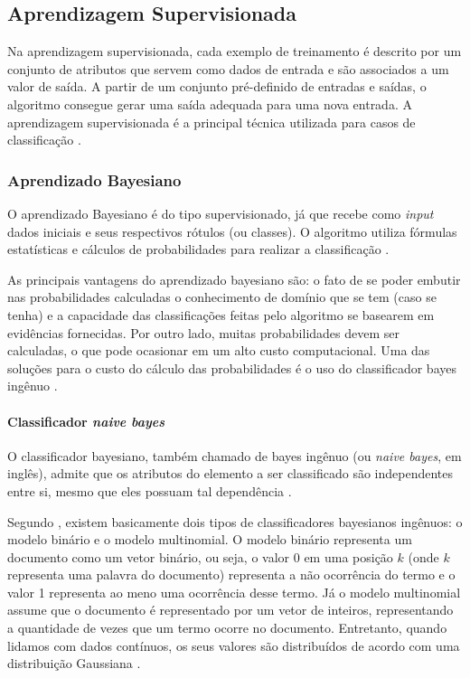 \subsection{Aprendizagem Supervisionada}

Na aprendizagem supervisionada, cada exemplo de treinamento é descrito por um conjunto de atributos que servem como dados de entrada e são associados a um valor de saída. A partir de um conjunto pré-definido de entradas e saídas, o algoritmo consegue gerar uma saída adequada para uma nova entrada. A aprendizagem supervisionada é a principal técnica utilizada para casos de classificação \cite{mohri2012}.

\subsubsection{Aprendizado Bayesiano}

O aprendizado Bayesiano é do tipo supervisionado, já que recebe como \textit{input} dados iniciais e seus respectivos rótulos (ou classes). O algoritmo utiliza fórmulas estatísticas e cálculos de probabilidades para realizar a classificação \cite{mitchell1997}.

As principais vantagens do aprendizado bayesiano são: o fato de se poder embutir nas probabilidades calculadas o conhecimento de domínio que se tem (caso se tenha) e a capacidade das classificações feitas pelo algoritmo se basearem em evidências fornecidas. Por outro lado, muitas probabilidades devem ser calculadas, o que pode ocasionar em um alto custo computacional. Uma das soluções para o custo do cálculo das probabilidades é o uso do classificador bayes ingênuo \cite{pardo2002}.

\paragraph{Classificador \textit{naive bayes}}

O classificador bayesiano, também chamado de bayes ingênuo (ou \textit{naive bayes}, em inglês), admite que os atributos do elemento a ser classificado são independentes entre si, mesmo que eles possuam tal dependência \cite{pellucci2011}.

Segundo , existem basicamente dois tipos de classificadores bayesianos ingênuos: o modelo binário e o modelo multinomial. O modelo binário representa um documento como um vetor binário, ou seja, o valor 0 em uma posição \(k\) (onde \(k\) representa uma palavra do documento) representa a não ocorrência do termo e o valor 1 representa ao meno uma ocorrência desse termo. Já o modelo multinomial assume que o documento é representado por um vetor de inteiros, representando a quantidade de vezes que um termo ocorre no documento. Entretanto, quando lidamos com dados contínuos, os seus valores são distribuídos de acordo com uma distribuição Gaussiana \cite{hand2001}.

